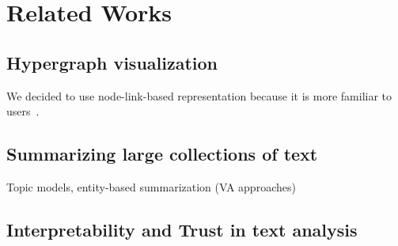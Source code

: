 \section{Related Works}
\subsection{Hypergraph visualization}
\cite{fischer2021hypergraphsurvey}
We decided to use node-link-based representation because it is more familiar to users~\cite{abdelaal2022network}.
\subsection{Summarizing large collections of text}
Topic models, entity-based summarization (VA approaches)
\subsection{Interpretability and Trust in text analysis}

